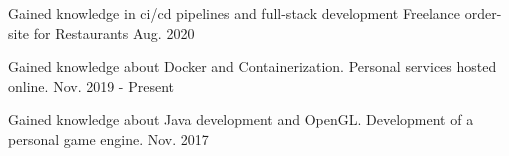

\begin{cventries}

  \cventry
    {Gained knowledge in ci/cd pipelines and full-stack development} %
    {Freelance order-site for Restaurants} %
    {} %
    {Aug. 2020} %

  \cventry
    {Gained knowledge about Docker and Containerization.} %
    {Personal services hosted online.} %
    {} %
    {Nov. 2019 - Present} %

  \cventry
    {Gained knowledge about Java development and OpenGL.} %
    {Development of a personal game engine.} %
    {} %
    {Nov. 2017} %

\end{cventries}

